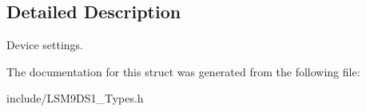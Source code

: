 \subsection{Detailed Description}
Device settings. 

The documentation for this struct was generated from the following file\+:\begin{DoxyCompactItemize}
\item 
include/L\+S\+M9\+D\+S1\+\_\+\+Types.\+h\end{DoxyCompactItemize}
